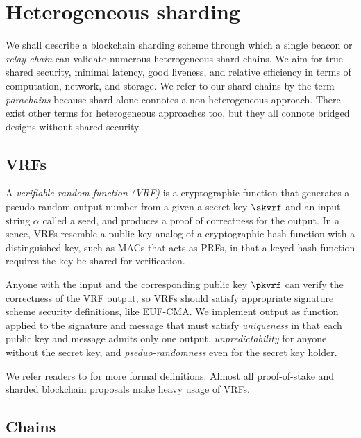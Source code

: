 
\section{Heterogeneous sharding}

We shall describe a blockchain sharding scheme through which a single beacon or {\em relay chain} can validate numerous heterogeneous shard chains.  We aim for true shared security, minimal latency, good liveness, and relative efficiency in terms of computation, network, and storage.  We refer to our shard chains by the term {\em parachains} because shard alone connotes a non-heterogeneous approach.  There exist other terms for heterogeneous approaches too, but they all connote bridged designs without shared security.

\subsection{VRFs}

A {\em verifiable random function (VRF)} is a cryptographic function that generates a pseudo-random output number from a given a secret key $\skvrf$ and an input string $\alpha$ called a seed, and produces a proof of correctness for the output.  In a sence, VRFs resemble a public-key analog of a cryptographic hash function with a distinguished key, such as MACs that acts as PRFs, in that a keyed hash function requires the key be shared for verification. 

Anyone with the input and the corresponding public key $\pkvrf$ can verify the correctness of the VRF output, so VRFs should satisfy appropriate signature scheme security definitions, like EUF-CMA.  We implement output as function applied to the signature and message that must satisfy {\em uniqueness} in that each public key and message admits only one output, {\em unpredictability} for anyone without the secret key, and {\em pseduo-randomness} even for the secret key holder.

We refer readers to \cite[\S1]{Sassafras} for more formal definitions.
Almost all proof-of-stake and sharded blockchain proposals make heavy usage of VRFs.

\subsection{Chains}

